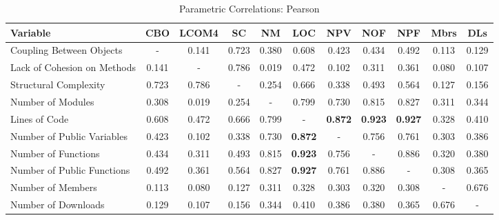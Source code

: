 \documentclass[conference]{IEEEtran}
\begin{document}
\begin{center}
\begin{table}[hbt]
\centering \caption{Parametric Correlations: Pearson}
\begin{tabular}{|l|c|c|c|c|c|c|c|c|c|c|} \hline

\textbf{Variable}           & CBO & LCOM4 & SC & NM & LOC & NPV & NOF & NPF & Mbrs & DLs
\\ \hline
Coupling Between Objects      & - & 0.141 & 0.723 & 0.380 & 0.608 & 0.423 & 0.434 & 0.492 & 0.113 & 0.129
\\ \hline
Lack of Cohesion on Methods & 0.141 & - & 0.786 & 0.019 & 0.472 & 0.102 & 0.311 & 0.361 & 0.080 & 0.107
\\ \hline
Structural Complexity       & 0.723 & 0.786 & - & 0.254 & 0.666 & 0.338 & 0.493 & 0.564 & 0.127 & 0.156
\\ \hline
    Number of Modules           & 0.308 & 0.019 & 0.254 & - & 0.799 & 0.730 & 0.815 & 0.827 & 0.311 & 0.344
\\ \hline
Lines of Code               & 0.608 & 0.472 & 0.666 & 0.799 & - & \textbf{0.872} & \textbf{0.923} & \textbf{0.927} & 0.328 & 0.410
\\ \hline
Number of Public Variables  & 0.423 & 0.102 & 0.338 & 0.730 & \textbf{0.872} & - & 0.756 & 0.761 & 0.303 & 0.386
\\ \hline
Number of Functions         & 0.434 & 0.311 & 0.493 & 0.815 & \textbf{0.923} & 0.756 & - & 0.886 & 0.320 & 0.380
\\ \hline
Number of Public Functions  & 0.492 & 0.361 & 0.564 & 0.827 & \textbf{0.927} & 0.761 & 0.886 & - & 0.308 & 0.365
\\ \hline
Number of Members           & 0.113 & 0.080 & 0.127 & 0.311 & 0.328 & 0.303 & 0.320 & 0.308 & - & 0.676
\\ \hline
Number of Downloads         & 0.129 & 0.107 & 0.156 & 0.344 & 0.410 & 0.386 & 0.380 & 0.365 & 0.676 & -
\\ \hline
\end{tabular}
\label{pearson}
\end{table}
\end{center}
\end{document}
